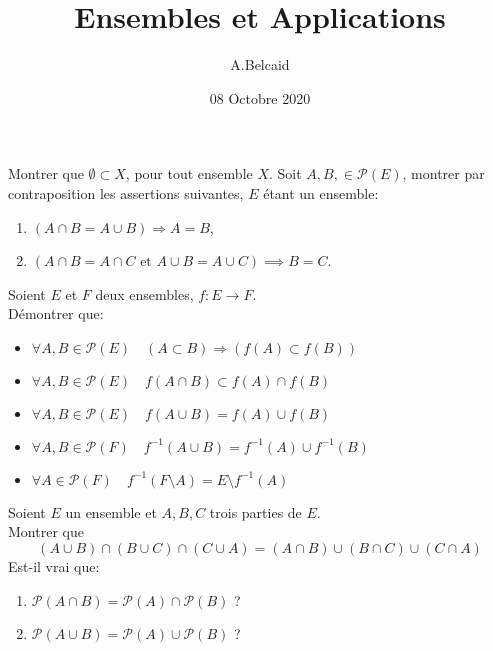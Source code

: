 \documentclass[10pt, a4paper, twocolumn]{homework}
\title{Ensembles et Applications}
\date{08 Octobre 2020}
\author{A.Belcaid}
\begin{document}
\maketitle

\exercice
Montrer que $\emptyset \subset X$, pour tout ensemble $X$.
\exercice
  Soit $A,B, \in \mathcal{P}(E)$,  montrer par contraposition les assertions suivantes, $E$ \'etant
un ensemble:
\begin{enumerate}
\item $(A\cap B=A\cup B)\Rightarrow A=B$,
\item $ (A\cap B=A\cap C \text{ et } A\cup B=A\cup C)\implies B=C$.
\end{enumerate}
\exercice
Soient $E$ et $F$ deux ensembles, $f:E\rightarrow F$.\\

D\'emontrer que:

\begin{itemize}
  \item $\forall A,B \in \mathcal{P}(E) \quad (A\subset B)\Rightarrow (f(A)\subset f(B))$
  \item $\forall A,B \in \mathcal{P}(E) \quad f(A\cap B)\subset f(A)\cap f(B)$
  \item $\forall A,B \in \mathcal{P}(E) \quad f(A\cup B) = f(A)\cup f(B)$
  \item $\forall A,B \in \mathcal{P}(F) \quad f^{-1}(A\cup B) = f^{-1}(A)\cup f^{-1}(B)$
  \item $\forall A \in \mathcal{P}(F) \quad f^{-1}(F\setminus A)=E\setminus f^{-1}(A)$
\end{itemize}

\exercice
Soient $E$ un ensemble et $A, B, C$ trois parties de $E$.\\
Montrer que
$$ (A \cup B) \cap (B \cup C) \cap (C \cup A) =
(A \cap B) \cup (B \cap C) \cup (C \cap A)$$
\exercice
Est-il vrai que:

\begin{enumerate}
  \item $\mathcal{P} (A \cap B) = \mathcal{P} (A) \cap \mathcal{P} (B)$ ?
  \item  $\mathcal{P} (A \cup B) = \mathcal{P} (A) \cup \mathcal{P} (B)$ ?
\end{enumerate}
\end{document}
